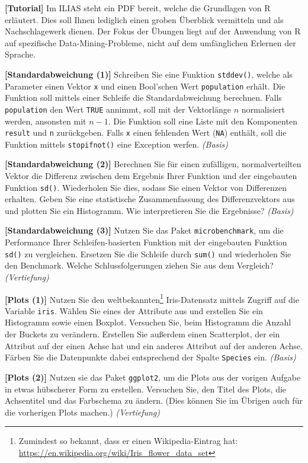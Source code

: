 \documentclass[headinclude,headsepline]{scrartcl}
\newcommand{\taskcategory}[1]{{\color[HTML]{800000}\emph{(#1)}}}
\newcommand{\taskname}[1]{\textbf{[#1]}}
\newcommand{\code}[1]{{\color[HTML]{000080}\texttt{#1}}}
\begin{document}
\begin{compactenum}[a)]\itemsep10pt
	\item
	\taskname{Tutorial}
	Im ILIAS steht ein PDF bereit, welche die Grundlagen von R erläutert.
	Dies soll Ihnen lediglich einen groben Überblick vermitteln und als Nachschlagewerk dienen.
	Der Fokus der Übungen liegt auf der Anwendung von R auf spezifische Data-Mining-Probleme,
	nicht auf dem umfänglichen Erlernen der Sprache.
	\item
	\taskname{Standardabweichung (1)}
	Schreiben Sie eine Funktion \code{stddev()}, welche als Parameter einen Vektor \code{x} und einen Bool'schen Wert \code{population} erhält.
	Die Funktion soll mittels einer Schleife die Standardabweichung berechnen.
	Falls \code{population} den Wert \code{TRUE} annimmt, soll mit der Vektorlänge $n$ normalisiert werden, ansonsten mit $n-1$.
	Die Funktion soll eine Liste mit den Komponenten \code{result} und \code{n} zurückgeben.
	Falls \code{x} einen fehlenden Wert (\code{NA}) enthält, soll die Funktion mittels \code{stopifnot()} eine Exception werfen.
	\taskcategory{Basis}
	\item
	\taskname{Standardabweichung (2)}
	Berechnen Sie für einen zufälligen, normalverteilten Vektor die Differenz zwischen dem Ergebnis Ihrer Funktion und der eingebauten Funktion \code{sd()}.
	Wiederholen Sie dies, sodass Sie einen Vektor von Differenzen erhalten.
	Geben Sie eine statistische Zusammenfassung des Differenzvektors aus und plotten Sie ein Histogramm.
	Wie interpretieren Sie die Ergebnisse?
	\taskcategory{Basis}
	\item
	\taskname{Standardabweichung (3)}
	Nutzen Sie das Paket \code{microbenchmark}, um die Performance Ihrer Schleifen-basierten Funktion mit der eingebauten Funktion \code{sd()} zu vergleichen.
	Ersetzen Sie die Schleife durch \code{sum()} und wiederholen Sie den Benchmark.
	Welche Schlussfolgerungen ziehen Sie aus dem Vergleich?
	\taskcategory{Vertiefung}
	\item
	\taskname{Plots (1)}
	Nutzen Sie den weltbekannten\footnote{Zumindest so bekannt, dass er einen Wikipedia-Eintrag hat: \url{https://en.wikipedia.org/wiki/Iris_flower_data_set}} Iris-Datensatz mittels Zugriff auf die Variable \code{iris}.
	Wählen Sie eines der Attribute aus und erstellen Sie ein Histogramm sowie einen Boxplot.
	Versuchen Sie, beim Histogramm die Anzahl der Buckets zu verändern.
	Erstellen Sie außerdem einen Scatterplot, der ein Attribut auf der einen Achse hat und ein anderes Attribut auf der anderen Achse.
	Färben Sie die Datenpunkte dabei entsprechend der Spalte \code{Species} ein.
	\taskcategory{Basis}
	\item
	\taskname{Plots (2)}
	Nutzen sie das Paket \code{ggplot2}, um die Plots aus der vorigen Aufgabe in etwas hübscherer Form zu erstellen.
	Versuchen Sie, den Titel des Plots, die Achsentitel und das Farbschema zu ändern. (Dies können Sie im Übrigen auch für die vorherigen Plots machen.)
	\taskcategory{Vertiefung}
\end{compactenum}
\end{document}

